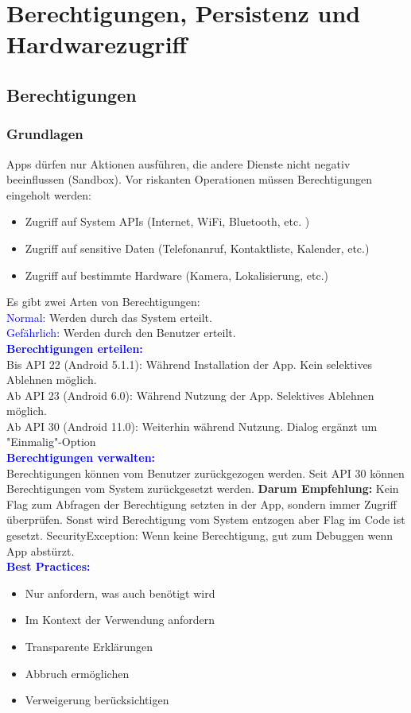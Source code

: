 
\section{Berechtigungen, Persistenz und Hardwarezugriff}
\subsection{Berechtigungen}
\subsubsection{Grundlagen}
Apps dürfen nur Aktionen ausführen, die andere Dienste nicht negativ beeinflussen (Sandbox). Vor riskanten Operationen müssen Berechtigungen eingeholt werden:
\begin{itemize}[topsep=0pt, leftmargin=4mm]
    \setlength\itemsep{-0.3em}
    \item Zugriff auf System APIs (Internet, WiFi, Bluetooth, etc. )
    \item Zugriff auf sensitive Daten (Telefonanruf, Kontaktliste, Kalender, etc.)
    \item Zugriff auf bestimmte Hardware (Kamera, Lokalisierung, etc.)
\end{itemize}
Es gibt zwei Arten von Berechtigungen:\\
\textcolor{blue}{Normal:} Werden durch das System erteilt.\\
\textcolor{blue}{Gefährlich:} Werden durch den Benutzer erteilt.\\
\textbf{\textcolor{blue}{Berechtigungen erteilen:}}\\
Bis API 22 (Android 5.1.1): Während Installation der App. Kein selektives Ablehnen möglich.\\
Ab API 23 (Android 6.0): Während Nutzung der App. Selektives Ablehnen möglich.\\
Ab API 30 (Android 11.0): Weiterhin während Nutzung. Dialog ergänzt um "Einmalig"-Option\\
\textbf{\textcolor{blue}{Berechtigungen verwalten:}}\\
Berechtigungen können vom Benutzer zurückgezogen werden. Seit API 30 können Berechtigungen vom System zurückgesetzt werden. \textbf{Darum Empfehlung:} Kein Flag zum Abfragen der Berechtigung setzten in der App, sondern immer Zugriff überprüfen. Sonst wird Berechtigung vom System entzogen aber Flag im Code ist gesetzt. SecurityException: Wenn keine Berechtigung, gut zum Debuggen wenn App abstürzt.\\
\textbf{\textcolor{blue}{Best Practices:}}
\begin{itemize}[topsep=0pt, leftmargin=4mm]
    \setlength\itemsep{-0.3em}
    \item Nur anfordern, was auch benötigt wird
    \item Im Kontext der Verwendung anfordern
    \item Transparente Erklärungen
    \item Abbruch ermöglichen
    \item Verweigerung berücksichtigen
\end{itemize}
